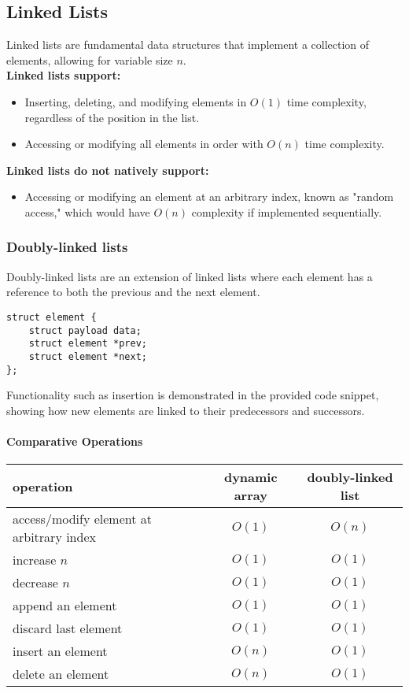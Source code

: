 \documentclass[12pt]{article}
\begin{document}
\subsection{Linked Lists}
Linked lists are fundamental data structures that implement a collection of elements, allowing for variable size \( n \).\\

\textbf{Linked lists support:}
\begin{itemize}
    \item Inserting, deleting, and modifying elements in \( O(1) \) time complexity, regardless of the position in the list.
    \item Accessing or modifying all elements in order with \( O(n) \) time complexity.
\end{itemize}

\textbf{Linked lists do not natively support:}
\begin{itemize}
    \item Accessing or modifying an element at an arbitrary index, known as "random access," which would have \( O(n) \) complexity if implemented sequentially.
\end{itemize}


\subsubsection{Doubly-linked lists}

Doubly-linked lists are an extension of linked lists where each element has a reference to both the previous and the next element.

\begin{verbatim}
struct element {
    struct payload data;
    struct element *prev;
    struct element *next;
};
\end{verbatim}

Functionality such as insertion is demonstrated in the provided code snippet, showing how new elements are linked to their predecessors and successors.

\paragraph{Comparative Operations}
\begin{tabular}{lcc}
\hline
\textbf{operation} & \textbf{dynamic array} & \textbf{doubly-linked list} \\
\hline
access/modify element at arbitrary index & \(O(1)\) & \(O(n)\) \\
increase \(n\) & \(O(1)\) & \(O(1)\) \\
decrease \(n\) & \(O(1)\) & \(O(1)\) \\
append an element & \(O(1)\) & \(O(1)\) \\
discard last element & \(O(1)\) & \(O(1)\) \\
insert an element & \(O(n)\) & \(O(1)\) \\
delete an element & \(O(n)\) & \(O(1)\) \\
\hline
\end{tabular}
\end{document}
